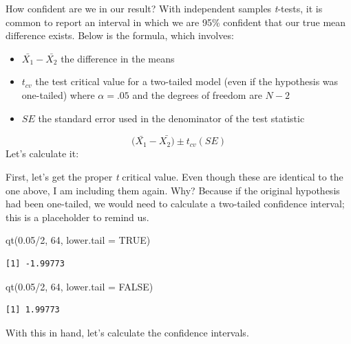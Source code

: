 \documentclass[
  11pt,
]{book}
\newenvironment{Shaded}{\begin{snugshade}}{\end{snugshade}}
\newcommand{\AttributeTok}[1]{\textcolor[rgb]{0.77,0.63,0.00}{#1}}
\newcommand{\ConstantTok}[1]{\textcolor[rgb]{0.00,0.00,0.00}{#1}}
\newcommand{\DecValTok}[1]{\textcolor[rgb]{0.00,0.00,0.81}{#1}}
\newcommand{\FloatTok}[1]{\textcolor[rgb]{0.00,0.00,0.81}{#1}}
\newcommand{\FunctionTok}[1]{\textcolor[rgb]{0.00,0.00,0.00}{#1}}
\newcommand{\NormalTok}[1]{#1}
\newcommand{\SpecialCharTok}[1]{\textcolor[rgb]{0.00,0.00,0.00}{#1}}
\providecommand{\tightlist}{%
  \setlength{\itemsep}{0pt}\setlength{\parskip}{0pt}}
\begin{document}
How confident are we in our result? With independent samples \emph{t}-tests, it is common to report an interval in which we are 95\% confident that our true mean difference exists. Below is the formula, which involves:

\begin{itemize}
\tightlist
\item
  \(\bar{X_{1}}-\bar{X_{2}}\) the difference in the means
\item
  \(t_{cv}\) the test critical value for a two-tailed model (even if the hypothesis was one-tailed) where \(\alpha = .05\) and the degrees of freedom are \(N-2\)
\item
  \(SE\) the standard error used in the denominator of the test statistic
\end{itemize}

\[(\bar{X_{1}} -\bar{X_{2})} \pm  t_{cv}(SE)\]
Let's calculate it:

First, let's get the proper \emph{t} critical value. Even though these are identical to the one above, I am including them again. Why? Because if the original hypothesis had been one-tailed, we would need to calculate a two-tailed confidence interval; this is a placeholder to remind us.

\begin{Shaded}
\begin{Highlighting}[]
\FunctionTok{qt}\NormalTok{(}\FloatTok{0.05}\SpecialCharTok{/}\DecValTok{2}\NormalTok{, }\DecValTok{64}\NormalTok{, }\AttributeTok{lower.tail =} \ConstantTok{TRUE}\NormalTok{)}
\end{Highlighting}
\end{Shaded}

\begin{verbatim}
[1] -1.99773
\end{verbatim}

\begin{Shaded}
\begin{Highlighting}[]
\FunctionTok{qt}\NormalTok{(}\FloatTok{0.05}\SpecialCharTok{/}\DecValTok{2}\NormalTok{, }\DecValTok{64}\NormalTok{, }\AttributeTok{lower.tail =} \ConstantTok{FALSE}\NormalTok{)}
\end{Highlighting}
\end{Shaded}

\begin{verbatim}
[1] 1.99773
\end{verbatim}

With this in hand, let's calculate the confidence intervals.
\end{document}

